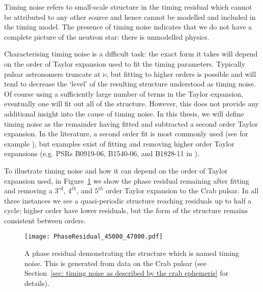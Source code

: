 Timing noise refers to small-scale structure in the timing residual which
cannot be attributed to any other source and hence cannot be modelled and
included in the timing model. The presence of timing noise indicates that we do
not have a complete picture of the neutron star: there is unmodelled physics.

Characterising timing noise is a difficult task: the exact form it takes will
depend on the order of Taylor expansion used to fit the timing parameters.
Typically pulsar astronomers truncate at $\ddot{\nu}$, but fitting to higher
orders is possible and will tend to decrease the `level' of the resulting
structure understood as timing noise. Of course using a sufficiently large
number of terms in the Taylor expansion, eventually one will fit out all of the
structure. However, this does not provide any additional insight into the cause
of timing noise. In this thesis, we will define timing noise as the remainder
having fitted and subtracted a second order Taylor expansion. In the
literature, a second order fit is most commonly used (see for example
\citet{Hobbs2010}), but examples exist of fitting and removing higher order
Taylor expansions (e.g. PSRs B0919-06, B1540-06, and B1828-11 in \citet{Lyne2010}).

To illustrate timing noise and how it can depend on the order of Taylor
expansion used, in Figure~\ref{fig: timing noise example} we show the phase
residual remaining after fitting and removing a $3^{rd}$, $4^{th}$, and
$5^{th}$ order Taylor expansion to the Crab pulsar. In all three instances we
see a quasi-periodic structure reaching residuals up to half a cycle; higher
order have lower residuals, but the form of the structure remains consistent
between orders.
\begin{figure}[htb]
\centering
\texttt{[image: PhaseResidual\_45000\_47000.pdf]}
\caption{A phase residual demonstrating the structure which is named timing
noise. This is generated from data on the Crab pulsar (see Section~\ref{sec:
timing noise as described by the crab ephemeris} for details).}
\label{fig: timing noise example}
\end{figure}

